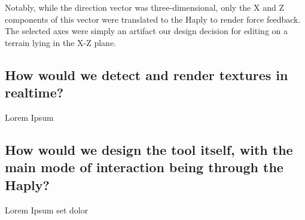 Notably, while the direction vector was three-dimensional, only the X and Z components of this vector were translated to the Haply to render force feedback. The selected axes were simply an artifact our design decision for editing on a terrain lying in the X-Z plane.

\subsection{How would we detect and render textures in realtime?}

Lorem Ipsum

\subsection{How would we design the tool itself, with the main mode of interaction being through the Haply?}

Lorem Ipsum set dolor 

